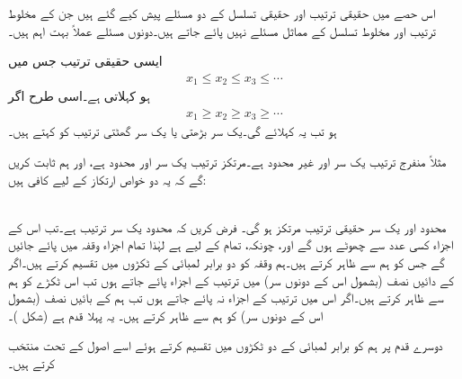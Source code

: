 اس حصے میں حقیقی ترتیب اور حقیقی تسلسل کے دو مسئلے پیش کیے گئے ہیں جن کے مخلوط ترتیب اور مخلوط تسلسل کے مماثل مسئلے نہیں پائے جاتے ہیں۔دونوں مسئلے عملاً بہت اہم ہیں۔

ایسی حقیقی ترتیب   جس میں
\begin{align*}
x_1\le x_2\le x_3\le\cdots
\end{align*} 
ہو  کہلاتی ہے۔اسی طرح  اگر
\begin{align*}
x_1\ge x_2\ge x_3\ge\cdots
\end{align*} 
ہو تب یہ  کہلائے گی۔یک سر بڑھتی یا یک سر گھٹتی ترتیب
 کو   کہتے ہیں۔

مثلاً منفرج ترتیب  یک سر اور غیر محدود ہے۔مرتکز ترتیب  یک سر اور محدود ہے، اور ہم ثابت کریں گے کہ یہ دو خواص ارتکاز کے لیے کافی ہیں:

\quad {}\\
محدود اور یک سر حقیقی ترتیب مرتکز ہو گی۔
\quad
فرض کریں کہ  محدود یک سر ترتیب ہے۔تب اس کے اجزاء کسی عدد  سے چھوٹے ہوں گے اور، چونکہ، تمام  کے لیے  ہے لہٰذا تمام اجزاء  وقفہ  میں پائے جائیں گے جس کو ہم  سے ظاہر کرتے ہیں۔ہم  وقفہ  کو دو برابر لمبائی کے ٹکڑوں میں تقسیم کرتے ہیں۔اگر  کے دائیں نصف (بشمول اس کے دونوں سر) میں ترتیب کے اجزاء پائے جاتے ہوں تب اس ٹکڑے کو ہم  سے ظاہر کرتے ہیں۔اگر اس میں ترتیب کے اجزاء نہ پائے جاتے ہوں تب ہم  کے بائیں نصف (بشمول اس کے دونوں سر) کو ہم  سے ظاہر کرتے ہیں۔ یہ پہلا قدم ہے
 (شکل )۔

دوسرے قدم پر ہم  کو برابر لمبائی کے دو ٹکڑوں میں تقسیم کرتے ہوئے اسے اصول کے تحت  منتخب کرتے ہیں۔

